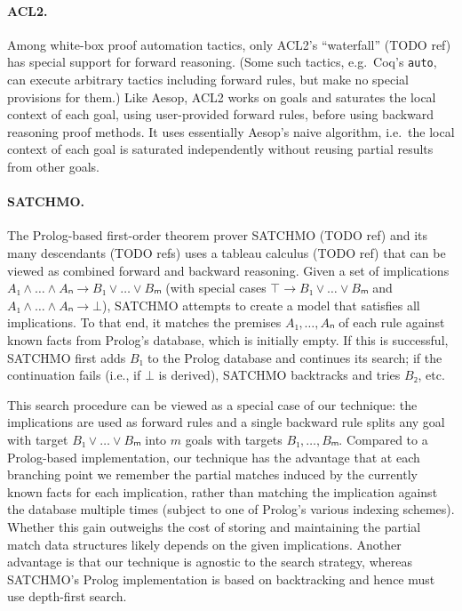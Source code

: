 \documentclass[runningheads]{llncs}
\begin{document}
\paragraph{ACL2.}
Among white-box proof automation tactics, only ACL2's \enquote{waterfall} (TODO ref) has special support for forward reasoning.
(Some such tactics, e.g.\ Coq's \texttt{auto}, can execute arbitrary tactics including forward rules, but make no special provisions for them.)
Like Aesop, ACL2 works on goals and saturates the local context of each goal, using user-provided forward rules, before using backward reasoning proof methods.
It uses essentially Aesop's naive algorithm, i.e.\ the local context of each goal is saturated independently without reusing partial results from other goals.

\paragraph{SATCHMO.}
The Prolog-based first-order theorem prover SATCHMO (TODO ref) and its many descendants (TODO refs) uses a tableau calculus (TODO ref) that can be viewed as combined forward and backward reasoning.
Given a set of implications $A₁ ∧ \dots ∧ Aₙ → B₁ ∨ \dots ∨ Bₘ$ (with special cases $⊤ → B₁ ∨ \dots ∨ Bₘ$ and $A₁ ∧ \dots ∧ Aₙ → ⊥$), SATCHMO attempts to create a model that satisfies all implications.
To that end, it matches the premises $A₁, \dots, Aₙ$ of each rule against known facts from Prolog's database, which is initially empty.
If this is successful, SATCHMO first adds $B₁$ to the Prolog database and continues its search; if the continuation fails (i.e., if $⊥$ is derived), SATCHMO backtracks and tries $B₂$, etc.

This search procedure can be viewed as a special case of our technique: the implications are used as forward rules and a single backward rule splits any goal with target $B₁ ∨ \dots ∨ Bₘ$ into $m$ goals with targets $B₁, \dots, Bₘ$.
Compared to a Prolog-based implementation, our technique has the advantage that at each branching point we remember the partial matches induced by the currently known facts for each implication, rather than matching the implication against the database multiple times (subject to one of Prolog's various indexing schemes).
Whether this gain outweighs the cost of storing and maintaining the partial match data structures likely depends on the given implications.
Another advantage is that our technique is agnostic to the search strategy, whereas SATCHMO's Prolog implementation is based on backtracking and hence must use depth-first search.
\end{document}
